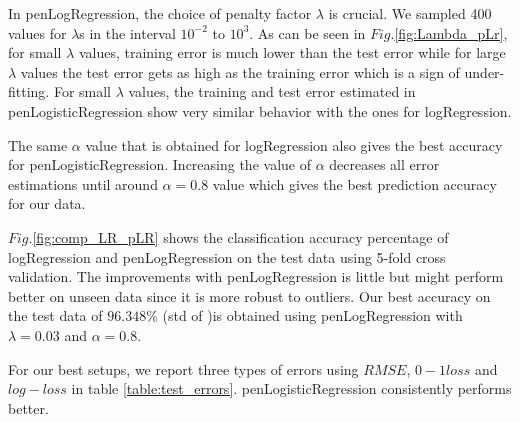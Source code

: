 In penLogRegression, the choice of penalty factor $\lambda$ is crucial.  We sampled 400 values for $\lambda$s in the interval  $10^{-2}$ to $10^3$. As can be seen in $Fig.$\ref{fig:Lambda_pLr}, for small $\lambda$ values, training error is much lower than the test error while for large $\lambda$ values the test error gets as high as the training error which is a sign of under-fitting. 
For small $\lambda$ values, the training and test error estimated in penLogisticRegression show very similar behavior with the ones for logRegression. 

The same $\alpha$ value that is obtained for logRegression  also gives the best accuracy for penLogisticRegression. Increasing the value of $\alpha$ decreases all error estimations until around $\alpha=0.8$ value which gives the best prediction accuracy for our data.


$Fig.$\ref{fig:comp_LR_pLR} shows the classification accuracy percentage  of logRegression and penLogRegression on the test data using 5-fold cross validation. The improvements with penLogRegression is little but might perform better on unseen data since it is more robust to outliers. Our best accuracy on the test data of $96.348\%$  (std of )is obtained using penLogRegression with $\lambda=0.03$ and $\alpha=0.8$. 

For our best setups, we report three types of errors using $RMSE$, $0-1 loss$ and $log-loss$  in table \ref{table:test_errors}. penLogisticRegression consistently performs better.

